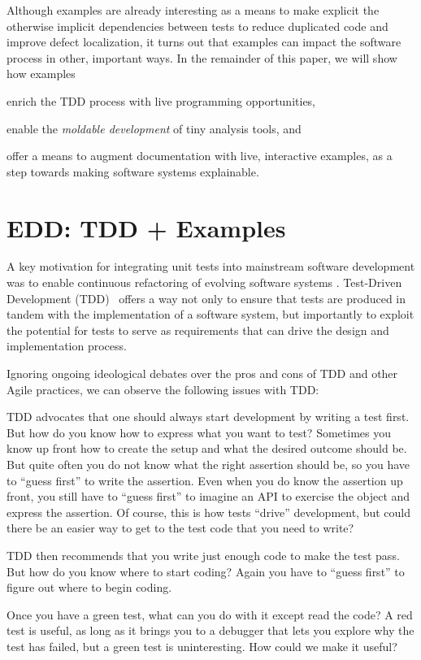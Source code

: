\documentclass[sigplan,anonymous,review,10pt]{acmart}
\begin{document}
Although examples are already interesting as a means to make explicit the otherwise implicit dependencies between tests to reduce duplicated code and improve defect localization, it turns out that examples can impact the software process in other, important ways.
In the remainder of this paper, we will show how examples
\begin{inparaenum}[(i)]
	\item enrich the TDD process with live programming opportunities,
	\item enable the \emph{moldable development} of tiny analysis tools, and
	\item offer a means to augment documentation with live, interactive examples, as a step towards making software systems explainable.
\end{inparaenum}

\section{EDD: TDD + Examples}\label{sec:edd}

A key motivation for integrating unit tests into mainstream software development was to enable continuous refactoring of evolving software systems \cite{Beck00a}.
Test-Driven Development (TDD)~\cite{Beck03a} offers a way not only to ensure that tests are produced in tandem with the implementation of a software system, but importantly to exploit the potential for tests to serve as requirements that can drive the design and implementation process.

Ignoring ongoing ideological debates over the pros and cons of TDD and other Agile practices, we can observe the following issues with TDD:
\begin{inparaenum}[(i)]
	\item TDD advocates that one should always start development by writing a test first.
But how do you know how to express what you want to test?
Sometimes you know up front how to create the setup and what the desired outcome should be.
But quite often you do not know what the right assertion should be, so you have to ``guess first'' to write the assertion.
Even when you do know the assertion up front, you still have to ``guess first'' to imagine an API to exercise the object and express the assertion.
Of course, this is how tests ``drive'' development, but could there be an easier way to get to the test code that you need to write?
	\item TDD then recommends that you write just enough code to make the test pass.
But how do you know where to start coding?
Again you have to ``guess first'' to figure out where to begin coding.
	\item Once you have a green test, what can you do with it except read the code?
A red test is useful, as long as it brings you to a debugger that lets you explore why the test has failed, but a green test is uninteresting.
How could we make it useful?
\end{inparaenum}
\end{document}
